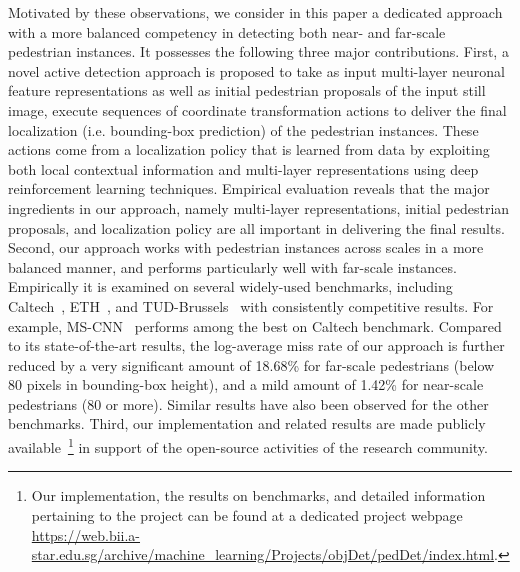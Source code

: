 \documentclass[10pt,journal,compsoc,twoside]{IEEEtran}
\begin{document}
Motivated by these observations, we consider in this paper a dedicated approach with a more balanced competency in detecting both near- and far-scale pedestrian instances. It possesses the following three major contributions. First, a novel active detection approach is proposed to take as input multi-layer neuronal feature representations as well as initial pedestrian proposals of the input still image, execute sequences of coordinate transformation actions to deliver the final localization (i.e. bounding-box prediction) of the pedestrian instances. These actions come from a localization policy that is learned from data by exploiting both local contextual information and multi-layer representations using deep reinforcement learning techniques. Empirical evaluation reveals that the major ingredients in our approach, namely multi-layer representations, initial pedestrian proposals, and localization policy are all important in delivering the final results. Second, our approach works with pedestrian instances across scales in a more balanced manner, and performs particularly well with far-scale instances. Empirically it is examined on several widely-used benchmarks, including Caltech~\cite{DolEtAl:cvpr09}, ETH~\cite{EssLeiGoo:iccv07}, %
and TUD-Brussels~\cite{WojWalSch:cvpr09} with consistently competitive results. For example, MS-CNN~\cite{CaiEtAl:eccv16} performs among the best on Caltech benchmark. Compared to its state-of-the-art results, the log-average miss rate of our approach is further reduced by a very significant amount of 18.68\% for far-scale pedestrians (below 80 pixels in bounding-box height), and a mild amount of 1.42\% for near-scale pedestrians (80 or more). Similar results have also been observed for the other benchmarks.
Third, our implementation and related results are made publicly available~\footnote{Our implementation, the results on benchmarks, and detailed information pertaining to the project can be found at a dedicated project webpage \url{https://web.bii.a-star.edu.sg/archive/machine_learning/Projects/objDet/pedDet/index.html}.} in support of the open-source activities of the research community.


\end{document}
